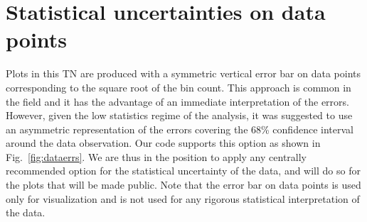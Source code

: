 \section{Statistical uncertainties on data points}
\label{app:dataerrorbars}

Plots in this TN are produced with a symmetric vertical error bar on data points corresponding to the square root of the bin count. This approach is common in the field and it has the advantage of an immediate interpretation of the errors. However, given the low statistics regime of the analysis, it was suggested to use an asymmetric representation of the errors covering the 68\% confidence interval around the data observation. Our code supports this option as shown in Fig.~\ref{fig:dataerrs}. We are thus in the position to apply any centrally recommended option for the statistical uncertainty of the data, and will do so for the plots that will be made public. Note that the error bar on data points is used only for visualization and is not used for any rigorous statistical interpretation of the data.

